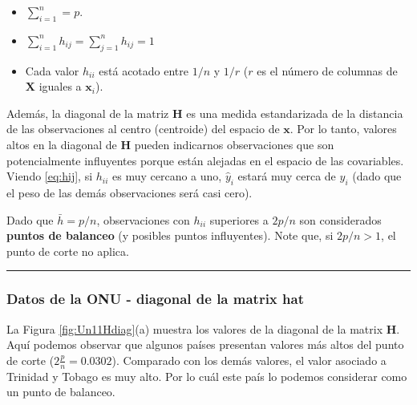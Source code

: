 \documentclass[
]{article}
\begin{document}
\begin{itemize}
\item $\sum_{i=1}^{n} = p$.
\item $\sum_{i=1}^{n}h_{ij} = \sum_{j=1}^{n}h_{ij} = 1$
\item Cada valor $h_{ii}$ está acotado entre $1/n$ y $1/r$ ($r$ es el número de columnas de $\boldsymbol X$ iguales a $\boldsymbol x_{i}$).
\end{itemize}

Además, la diagonal de la matriz \(\boldsymbol H\) es una medida estandarizada de la distancia de las observaciones al centro (centroide) del espacio de \(\boldsymbol x\). Por lo tanto, valores altos en la diagonal de \(\boldsymbol H\) pueden indicarnos observaciones que son potencialmente influyentes porque están alejadas en el espacio de las covariables. Viendo \eqref{eq:hij}, si \(h_{ii}\) es muy cercano a uno, \(\widehat{y}_{i}\) estará muy cerca de \(y_{i}\) (dado que el peso de las demás observaciones será casi cero).

Dado que \(\bar{h} = p/n\), observaciones con \(h_{ii}\) superiores a \(2p/n\) son considerados \textbf{puntos de balanceo} (y posibles puntos influyentes). Note que, si \(2p/n > 1\), el punto de corte no aplica.

\rule{\textwidth}{0.4pt}

\hypertarget{datos-de-la-onu---diagonal-de-la-matrix-hat}{%
\subsubsection*{Datos de la ONU - diagonal de la matrix hat}\label{datos-de-la-onu---diagonal-de-la-matrix-hat}}

La Figura \ref{fig:Un11Hdiag}(a) muestra los valores de la diagonal de la matrix \(\boldsymbol H\). Aquí podemos observar que algunos países presentan valores más altos del punto de corte (\(2\frac{p}{n} = 0.0302\)). Comparado con los demás valores, el valor asociado a Trinidad y Tobago es muy alto. Por lo cuál este país lo podemos considerar como un punto de balanceo.
\end{document}
